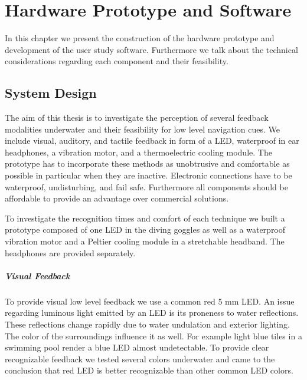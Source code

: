 %

\chapter{Hardware Prototype and Software }
\label{ownwork} 


In this chapter we present the construction of the hardware prototype and development of the user study software. 
Furthermore we talk about the technical considerations regarding each component and their feasibility.


\section{System Design}
The aim of this thesis is to investigate the perception of several feedback modalities underwater and their feasibility for low level navigation cues.
We include visual, auditory, and tactile feedback in form of a LED, waterproof in ear headphones,  a vibration motor, and a thermoelectric cooling module.
The prototype has to incorporate these methods as unobtrusive and comfortable as possible in particular when they are inactive. 
Electronic connections have to be waterproof, undisturbing, and fail safe.
Furthermore all components should be affordable to provide an advantage over commercial solutions.

To investigate the recognition times and comfort of each technique we built a prototype composed of one LED in the diving goggles as well as a waterproof vibration motor and a Peltier cooling module in a stretchable headband.
The headphones are provided separately.

\paragraph{Visual Feedback}

To provide visual low level feedback we use a common red 5 mm LED.
An issue regarding luminous light emitted by an LED is its proneness to water reflections.
These reflections change rapidly due to water undulation and exterior lighting.
The color of the surroundings influence it as well.
For example light blue tiles in a swimming pool render a blue LED almost undetectable.
To provide clear recognizable feedback we tested several colors underwater and came to the conclusion that red LED is better recognizable than other common LED colors.

